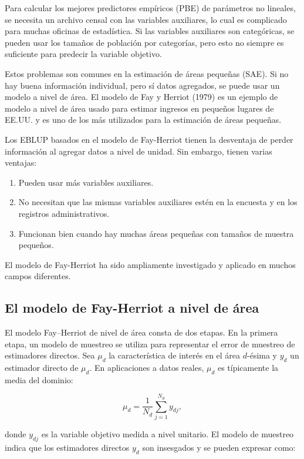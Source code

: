 \documentclass[12pt,spanish]{article}
\begin{document}
Para calcular los mejores predictores empíricos (PBE) de parámetros no lineales, se necesita un archivo censal con las variables auxiliares, lo cual es complicado para muchas oficinas de estadística. Si las variables auxiliares son categóricas, se pueden usar los tamaños de población por categorías, pero esto no siempre es suficiente para predecir la variable objetivo.

Estos problemas son comunes en la estimación de áreas pequeñas (SAE). Si no hay buena información individual, pero sí datos agregados, se puede usar un modelo a nivel de área. El modelo de Fay y Herriot (1979) es un ejemplo de modelo a nivel de área usado para estimar ingresos en pequeños lugares de EE.UU. y es uno de los más utilizados para la estimación de áreas pequeñas.

Los EBLUP basados en el modelo de Fay-Herriot tienen la desventaja de perder información al agregar datos a nivel de unidad. Sin embargo, tienen varias ventajas:

\begin{enumerate}
    \item Pueden usar más variables auxiliares.
    \item No necesitan que las mismas variables auxiliares estén en la encuesta y en los registros administrativos.
    \item Funcionan bien cuando hay muchas áreas pequeñas con tamaños de muestra pequeños.
\end{enumerate}

El modelo de Fay-Herriot ha sido ampliamente investigado y aplicado en muchos campos diferentes.

\subsection*{El modelo de Fay-Herriot a nivel de área}

El modelo Fay--Herriot de nivel de área consta de dos etapas. En la primera etapa, un modelo de muestreo se utiliza para representar el error de muestreo de estimadores directos. Sea \(\mu_d\) la característica de interés en el área \(d\)-ésima y \(y_d\) un estimador directo de \(\mu_d\). En aplicaciones a datos reales, \(\mu_d\) es típicamente la media del dominio:

\[
\mu_d = \frac{1}{N_d} \sum_{j=1}^{N_d} y_{dj},
\]

donde \(y_{dj}\) es la variable objetivo medida a nivel unitario. El modelo de muestreo indica que los estimadores directos \(y_d\) son insesgados y se pueden expresar como:
\end{document}
